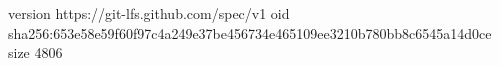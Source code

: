 version https://git-lfs.github.com/spec/v1
oid sha256:653e58e59f60f97c4a249e37be456734e465109ee3210b780bb8c6545a14d0ce
size 4806
